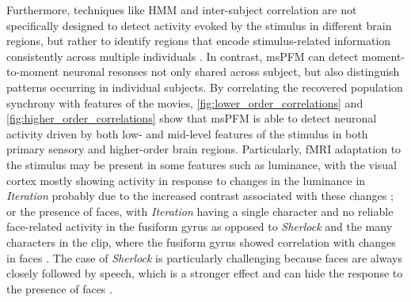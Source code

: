 Furthermore, techniques like HMM and inter-subject correlation are not
specifically designed to detect activity evoked by the stimulus in different
brain regions, but rather to identify regions that encode stimulus-related
information consistently across multiple individuals
\citep{Nastase2019Measuringsharedresponses}. In contrast, msPFM can detect
moment-to-moment neuronal resonses not only shared across subject, but also
distinguish patterns occurring in individual subjects. By correlating the
recovered population synchrony with features of the movies,
\cref{fig:lower_order_correlations} and \cref{fig:higher_order_correlations}
show that msPFM is able to detect neuronal activity driven by both low- and
mid-level features of the stimulus in both primary sensory and higher-order
brain regions. Particularly, fMRI adaptation to the stimulus
\citep{GrillSpector2001fMRadaptationtool} may be present in some features such
as luminance, with the visual cortex mostly showing activity in response to
changes in the luminance in \textit{Iteration} probably due to the increased
contrast associated with these changes
\citep{Goodyear1998EffectLuminanceContrast}; or the presence of faces, with
\textit{Iteration} having a single character and no reliable face-related
activity in the fusiform gyrus as opposed to \textit{Sherlock} and the many
characters in the clip, where the fusiform gyrus showed correlation with changes
in faces
\citep{Kanwisher1997FusiformFaceArea,Kanwisher2006fusiformfacearea,Rossion2003functionallydefinedright}.
The case of \textit{Sherlock} is particularly challenging because faces are
always closely followed by speech, which is a stronger effect and can hide the
response to the presence of faces \citep{Vega2022Neuroscoutunifiedplatform}.

